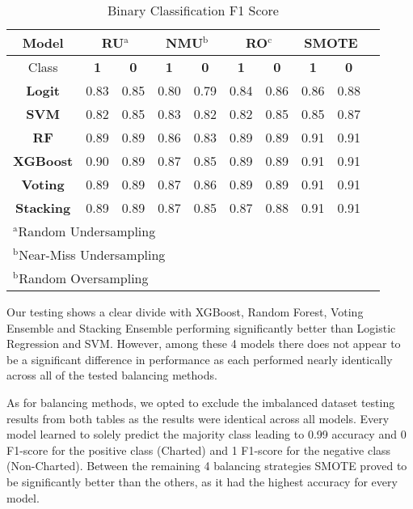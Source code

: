 \documentclass[conference]{IEEEtran}
\begin{document}
\begin{table}[htbp]
\caption{Binary Classification F1 Score}
\begin{center}
\begin{tabular}{|c|c|c|c|c|c|c|c|c|c|}
\hline
\textbf{Model}&\multicolumn{2}{|c|}{\textbf{RU$^{\mathrm{a}}$}}&\multicolumn{2}{|c|}{\textbf{NMU$^{\mathrm{b}}$}}&\multicolumn{2}{|c|}{\textbf{RO$^{\mathrm{c}}$}}&\multicolumn{2}{|c|}{\textbf{SMOTE}} \\
\hline
 Class & \textbf{1} & \textbf{0} & \textbf{1} & \textbf{0} & \textbf{1} & \textbf{0} & \textbf{1} & \textbf{0}\\
 \hline
\textbf{Logit} & 0.83 & 0.85 & 0.80 & 0.79 & 0.84 & 0.86 & 0.86 & 0.88\\
\textbf{SVM} & 0.82 & 0.85 & 0.83 & 0.82 & 0.82 & 0.85 & 0.85 & 0.87\\
\textbf{RF} & 0.89 & 0.89 & 0.86 & 0.83 & 0.89 & 0.89 & 0.91 & 0.91\\
\textbf{XGBoost} & 0.90 & 0.89 & 0.87 & 0.85 & 0.89 & 0.89 & 0.91 & 0.91\\
\textbf{Voting} & 0.89 & 0.89 & 0.87 & 0.86 & 0.89 & 0.89 & 0.91 & 0.91\\
\textbf{Stacking} & 0.89 & 0.89 & 0.87 & 0.85 & 0.87 & 0.88 & 0.91 & 0.91\\
\hline
\multicolumn{9}{l}{$^{\mathrm{a}}$Random Undersampling}\\
\multicolumn{9}{l}{$^{\mathrm{b}}$Near-Miss Undersampling}\\
\multicolumn{9}{l}{$^{\mathrm{b}}$Random Oversampling}\\
\end{tabular}

\label{tab3}
\end{center}
\end{table}

Our testing shows a clear divide with XGBoost, Random Forest, Voting Ensemble and Stacking Ensemble performing significantly better than Logistic Regression and SVM. However, among these 4 models there does not appear to be a significant difference in performance as each performed nearly identically across all of the tested balancing methods.

As for balancing methods, we opted to exclude the imbalanced dataset testing results from both tables as the results were identical across all models. Every model learned to solely predict the majority class leading to 0.99 accuracy and 0 F1-score for the positive class (Charted) and 1 F1-score for the negative class (Non-Charted). Between the remaining 4 balancing strategies SMOTE proved to be significantly better than the others, as it had the highest accuracy for every model.
\end{document}
